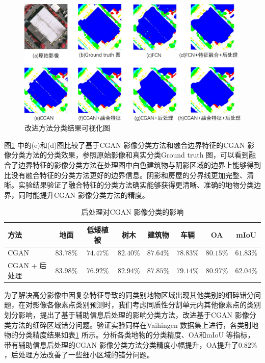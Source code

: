 \begin{figure}[!h]
    \centering
    \includegraphics[width=1.0\textwidth]{figures/youhua_res}
    \caption{改进方法分类结果可视化图 }\label{fig:youhua_res}
\end{figure}

图\ref{fig:youhua_res} 中的(e)和(d)图比较了基于CGAN 影像分类方法和融合边界特征的CGAN 影像分类方法的分类效果，参照原始影像和真实分类Ground truth 图，可以看到融合了边界特征的影像分类方法在处理图中白色建筑物与阴影区域的边界上能够得到比没有融合特征的分类方法更好的边界信息。阴影和房屋的分界线更加完整、清晰。实验结果验证了融合特征的分类方法确实能够获得更清晰、准确的地物分类边界，同时能提升CGAN 影像分类方法的精度。

\begin{table}[!h]
    \centering
    \caption{后处理对CGAN 影像分类的影响}\label{tab:post_cgan}
    \begin{tabular}{p{4cm}ccccccc}
        \toprule
        方法          & 地面      & 低矮植被  & 树木      & 建筑物    & 车辆      & OA        & mIoU      \\
        \midrule
        CGAN          & $83.78\%$ & $74.47\%$ & $82.40\%$ & $87.64\%$ & $78.83\%$ & $80.15\%$ & $61.83\%$ \\
        CGAN + 后处理 & $83.98\%$ & $76.92\%$ & $82.94\%$ & $87.85\%$ & $79.14\%$ & $80.97\%$ & $62.04\%$ \\
        \bottomrule
    \end{tabular}
\end{table}

为了解决高分影像中因复杂特征导致的同类别地物区域出现其他类别的细碎错分问题，在对影像各像素点类别预测时，我们考虑同质性分割单元内其他像素点的类别划分影响，提出了基于辅助信息后处理的影响分类方法，改进基于CGAN 影像分类方法的细碎区域错分问题。验证实验同样在Vaihingen 数据集上进行，各类别地物的分类精度结果如表\ref{tab:post_cgan} 所示。分析各类地物的分类精度、OA和mIoU 等指标，带有辅助信息后处理的CGAN 影像分类方法分类精度小幅提升，OA提升了$0.82\%$，后处理方法改善了一些细小区域的错分问题。

